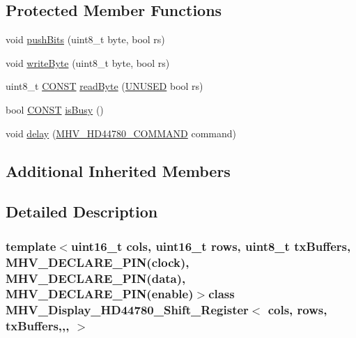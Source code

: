 \subsection*{Protected Member Functions}
\begin{DoxyCompactItemize}
\item 
void \hyperlink{class_m_h_v___display___h_d44780___shift___register_a6afc7706f61c9a8c9badb00df0a87f97}{push\-Bits} (uint8\-\_\-t byte, bool rs)
\item 
void \hyperlink{class_m_h_v___display___h_d44780___shift___register_a4633c34cf0d4f3d340d62ad19f605afd}{write\-Byte} (uint8\-\_\-t byte, bool rs)
\item 
uint8\-\_\-t \hyperlink{_m_h_v__io_8h_a0c33b494a68ce28497e7ce8e5e95feff}{C\-O\-N\-S\-T} \hyperlink{class_m_h_v___display___h_d44780___shift___register_af5a523eb25e44b6e051a6d2b9b49b2a5}{read\-Byte} (\hyperlink{_m_h_v__io_8h_addf5ec070e9499d36b7f2009ce736076}{U\-N\-U\-S\-E\-D} bool rs)
\item 
bool \hyperlink{_m_h_v__io_8h_a0c33b494a68ce28497e7ce8e5e95feff}{C\-O\-N\-S\-T} \hyperlink{class_m_h_v___display___h_d44780___shift___register_a7211cf9750bed32bbb96bb487651689a}{is\-Busy} ()
\item 
void \hyperlink{class_m_h_v___display___h_d44780___shift___register_a18926a5b44b702f9924fbf91556e9421}{delay} (\hyperlink{_m_h_v___display___h_d44780_8h_a76bff68a0c366080486a09e3beec77e1}{M\-H\-V\-\_\-\-H\-D44780\-\_\-\-C\-O\-M\-M\-A\-N\-D} command)
\end{DoxyCompactItemize}
\subsection*{Additional Inherited Members}


\subsection{Detailed Description}
\subsubsection*{template$<$uint16\-\_\-t cols, uint16\-\_\-t rows, uint8\-\_\-t tx\-Buffers, M\-H\-V\-\_\-\-D\-E\-C\-L\-A\-R\-E\-\_\-\-P\-I\-N(clock), M\-H\-V\-\_\-\-D\-E\-C\-L\-A\-R\-E\-\_\-\-P\-I\-N(data), M\-H\-V\-\_\-\-D\-E\-C\-L\-A\-R\-E\-\_\-\-P\-I\-N(enable)$>$class M\-H\-V\-\_\-\-Display\-\_\-\-H\-D44780\-\_\-\-Shift\-\_\-\-Register$<$ cols, rows, tx\-Buffers,,, $>$}

